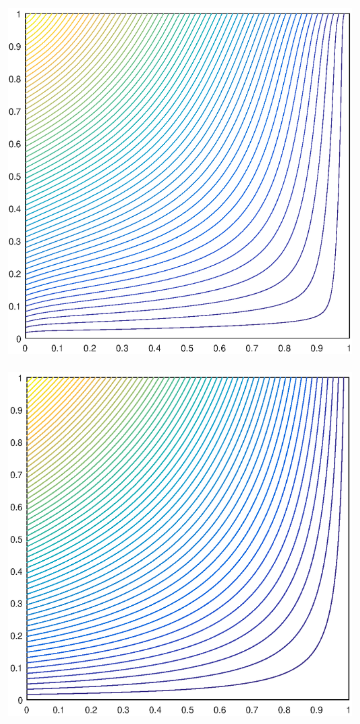 \documentclass[11pt]{article}
\begin{document}
\begin{figure}
\begin{subfigure}[b]{0.225\textwidth}
		\caption{}
	\end{subfigure}
	\vfill
	\begin{subfigure}[b]{0.225\textwidth}
		\centering
		\includegraphics[width=\textwidth]{figures/square_MV1_contour_b4.eps}
		\caption{}
	\end{subfigure}
	\hspace{1cm}
	\begin{subfigure}[b]{0.225\textwidth}
		\centering
		\includegraphics[width=\textwidth]{figures/square_MAXENT1_contour_b4.eps}

\end{subfigure}
\end{figure}
\end{document}
